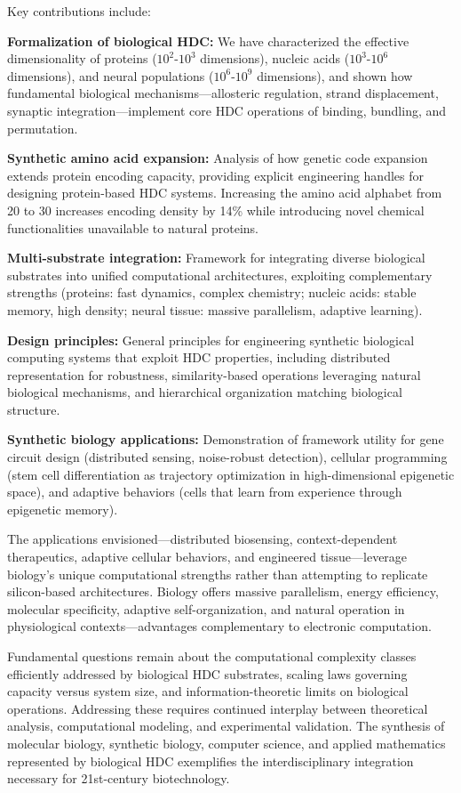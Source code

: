 \documentclass[12pt]{article}
\begin{document}
Key contributions include:

\textbf{Formalization of biological HDC:} We have characterized the effective dimensionality of proteins ($10^2$-$10^3$ dimensions), nucleic acids ($10^3$-$10^6$ dimensions), and neural populations ($10^6$-$10^9$ dimensions), and shown how fundamental biological mechanisms—allosteric regulation, strand displacement, synaptic integration—implement core HDC operations of binding, bundling, and permutation.

\textbf{Synthetic amino acid expansion:} Analysis of how genetic code expansion extends protein encoding capacity, providing explicit engineering handles for designing protein-based HDC systems. Increasing the amino acid alphabet from 20 to 30 increases encoding density by 14\% while introducing novel chemical functionalities unavailable to natural proteins.

\textbf{Multi-substrate integration:} Framework for integrating diverse biological substrates into unified computational architectures, exploiting complementary strengths (proteins: fast dynamics, complex chemistry; nucleic acids: stable memory, high density; neural tissue: massive parallelism, adaptive learning).

\textbf{Design principles:} General principles for engineering synthetic biological computing systems that exploit HDC properties, including distributed representation for robustness, similarity-based operations leveraging natural biological mechanisms, and hierarchical organization matching biological structure.

\textbf{Synthetic biology applications:} Demonstration of framework utility for gene circuit design (distributed sensing, noise-robust detection), cellular programming (stem cell differentiation as trajectory optimization in high-dimensional epigenetic space), and adaptive behaviors (cells that learn from experience through epigenetic memory).

The applications envisioned—distributed biosensing, context-dependent therapeutics, adaptive cellular behaviors, and engineered tissue—leverage biology's unique computational strengths rather than attempting to replicate silicon-based architectures. Biology offers massive parallelism, energy efficiency, molecular specificity, adaptive self-organization, and natural operation in physiological contexts—advantages complementary to electronic computation.

Fundamental questions remain about the computational complexity classes efficiently addressed by biological HDC substrates, scaling laws governing capacity versus system size, and information-theoretic limits on biological operations. Addressing these requires continued interplay between theoretical analysis, computational modeling, and experimental validation. The synthesis of molecular biology, synthetic biology, computer science, and applied mathematics represented by biological HDC exemplifies the interdisciplinary integration necessary for 21st-century biotechnology.
\end{document}
